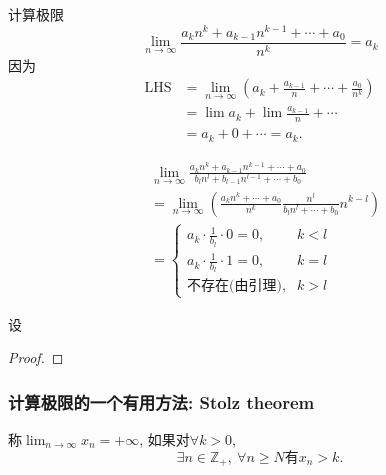 \begin{example}
    计算极限
    \begin{equation}
      \lim_{n \to \infty} \frac{a_k n^{k} + a_{k-1}n^{k-1} + \cdots + a_0}{n^{k}} = a_k
    \end{equation}
    因为
    \begin{align}
        \text{LHS} & = \lim_{n \to \infty}\left( a_k + \frac{a_{k-1}}{n} + \cdots + \frac{a_0}{n^{k}} \right) 
        \\
        & = \lim a_k + \lim \frac{a_{k-1}}{n} + \cdots 
        \\
        & = a_k + 0 + \cdots = a_k.
    \end{align}
\end{example}

\begin{example}
    \begin{align}
      & \lim_{n \to \infty} \frac{a_kn^{k}+ a_{k-1}n^{k-1} + \cdots + a_0}{b_l n^{l} + b_{l-1} n^{l-1} + \cdots +b_0}
      \\
      & = \lim_{n \to \infty}\left( \frac{a_kn^{k}+ \cdots +a_0}{n^{k}} \frac{n^{l}}{b_l n^{l}+ \cdots +b_0} n^{k-l} \right) 
      \\
      & = \begin{cases} 
        a_k \cdot \frac{1}{b_l}\cdot 0 = 0 , & k<l 
        \\ 
        a_k\cdot \frac{1}{b_l} \cdot 1 = 0, &  k=l
        \\
        \text{不存在(由引理)} , & k>l
      \end{cases}
    \end{align}
    \begin{lemma}
        设
    \end{lemma}
    \begin{proof}
        
    \end{proof}
\end{example}


\subsubsection[Stolz 定理]{计算极限的一个有用方法: Stolz theorem}
\begin{definition}
    称$\displaystyle \lim_{n \to \infty}x_n = +\infty$, 如果对$\forall k>0$,
    \begin{equation}
      \exists n\in \mathbb{Z}_{+} ,\ \forall n\ge N \text{有} x_n>k.
    \end{equation}
\end{definition}

